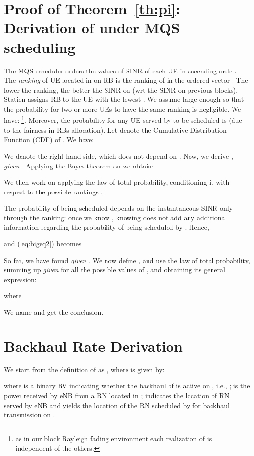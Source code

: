 \documentclass[draftcls,onecolumn]{IEEEtran}
\theoremstyle{plain}
\theoremstyle{definition}
\begin{document}
\section{Proof of Theorem~\ref{th:pi}: Derivation of  under MQS scheduling} \label{appendix:MQS}
The MQS scheduler orders the values of SINR  of each UE in ascending order. 
The {\it ranking}  of UE  located in  on RB  is the ranking of  in the ordered vector . The lower the ranking, the better the SINR on  (wrt the SINR on previous blocks). 
Station  assigns RB  to the UE with the lowest . We assume  large enough so that the probability for two or more UEs to have the same ranking is negligible.  
We have: \footnote{as in our block Rayleigh fading environment each realization of  is independent of the others.}. 
Moreover, the probability for any UE served by  to be scheduled is  (due to the fairness in RBs allocation). 
Let  denote the Cumulative Distribution Function (CDF) of . We have: 

We denote  the right hand side, which does not depend on . Now, we derive , {\it given} . Applying the Bayes theorem on  we obtain:

We then work on  applying the law of total probability, conditioning it with respect to the possible rankings :

The probability of being scheduled depends on the instantaneous SINR only through the ranking: once we know , knowing  does not add any additional information regarding the probability of being scheduled by .
Hence, 

and (\ref{eq:bigeq2}) becomes


So far, we have found  {\it given} .
We now define , and use the law of total probability, summing up  {\it given}  for all the possible values of , and obtaining its general expression:

where

We name  and get the conclusion. 




\section{Backhaul Rate Derivation}\label{appendix:back}

We start from the definition of  as 
,
where  is given by: 

where  is a binary RV indicating whether the backhaul of  is active on , i.e.,  ;  is the power received by eNB  from a RN located in ;  indicates the location of RN  served by eNB  and  yields the location of the RN scheduled by  for backhaul transmission on .
\end{document}
